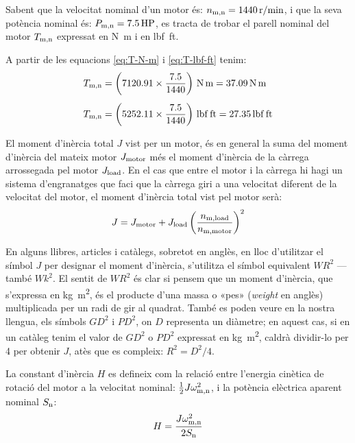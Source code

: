 	
\begin{exemple}[\MotorParellNom{}]
	\addcontentsxms{\MotorParellNom}
    Sabent que la velocitat nominal d'un motor és: $n_\mathrm{m,n} = \qty{1440}{r/min}$, i que la seva potència nominal és: $P_\mathrm{m,n} = \qty{7,5}{HP}$,   es tracta de trobar el parell nominal del motor $T_\mathrm{m,n}$ expressat en \unit{N.m} i en \unit{lbf.ft}.

    A partir de les equacions  \eqref{eq:T-N-m} i \eqref{eq:T-lbf-ft} tenim:
    \begin{align*}
      T\ped{m,n} &= \left(\num{7120,91} \times \frac{\num{7,5}}{1440}\right)
      \,\unit{N.m} = \qty{37,09}{N.m} \\[1ex]
      T\ped{m,n} &= \left(\num{5252,11} \times \frac{\num{7,5}}{1440}\right)
      \,\unit{lbf.ft} = \qty{27,35}{lbf.ft}
    \end{align*}
\end{exemple}


El moment d'inèrcia total $J$ vist per un motor, és en general la suma del moment d'inèrcia del mateix motor  $J_\mathrm{motor}$ més el moment d'inèrcia de la càrrega arrossegada pel motor $J_\mathrm{load}$. En el cas que entre el motor i la càrrega hi hagi un sistema d'engranatges que faci que la càrrega giri a una velocitat diferent de la velocitat del motor, el  moment d'inèrcia total vist pel motor serà:
\begin{equation}\index{moment!d'inèrcia}\index{J@$J$}
    J = J\ped{motor} +  J\ped{load}
    \left(\frac{n\ped{m,load}}{n\ped{m,motor}}\right)^2
\end{equation}

En alguns llibres, articles i catàlegs, sobretot en anglès, en lloc d'utilitzar el símbol $J$ per designar el moment d'inèrcia, s'utilitza el símbol equivalent $WR^2$ ---també $Wk^2$. El sentit de $WR^2$ és clar si pensem que un moment d'inèrcia, que s'expressa en \unit{kg.m^2},  és el producte d'una massa o «pes» (\textit{weight} en anglès) multiplicada per un radi de gir al quadrat. També es poden veure en la nostra llengua, els símbols $GD^2$ i $PD^2$, on $D$ representa un diàmetre; en aquest cas, si en un catàleg tenim el valor de $GD^2$ o $PD^2$ expressat en \unit{kg.m^2}, caldrà dividir-lo per 4 per obtenir $J$, atès que es compleix: $R^2 = D^2/4$.

La constant d'inèrcia $H$ es defineix com la relació entre l'energia cinètica de rotació del motor  a la velocitat nominal: $\frac{1}{2} J \omega_\mathrm{m,n}^2$, i la  potència elèctrica aparent nominal $S_\mathrm{n}$:
\begin{equation}\index{constants!d'inèrcia}\index{H@$H$}
    H = \frac{J \omega\ped{m,n}^2}{2 S\ped{n}}
\end{equation}

